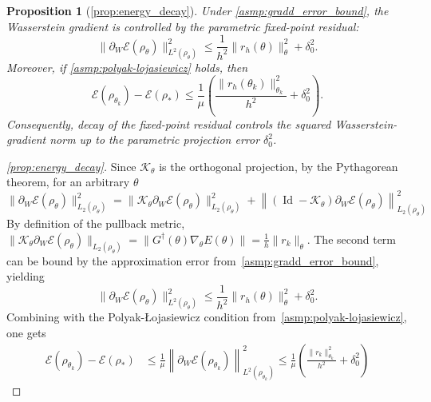 \documentclass{article} %
\newtheorem{proposition}{Proposition}[section]
\numberwithin{equation}{subsection}
\numberwithin{theorem}{section}
\newcommand{\cE}{\mathcal{E}}
\newcommand{\cK}{\mathcal{K}}
\newcommand{\Id}{\operatorname{Id}}
\begin{document}
\begin{proposition}[\autoref{prop:energy_decay}]
Under \autoref{asmp:gradd_error_bound}, the Wasserstein gradient is controlled
by the parametric fixed-point residual:
\begin{equation}\label{eq:projected_gradient_bound}
    \|\partial_W\cE(\rho_\theta)\|_{L^2(\rho_\theta)}^2
    \leq
    \frac{1}{h^2}\|r_h(\theta)\|_\theta^2
    +
    \delta_0^2 .
\end{equation}
Moreover, if \autoref{asmp:polyak-lojasiewicz} holds, then
\begin{equation}
    \cE(\rho_{\theta_k})-\cE(\rho_*)
    \leq
    \frac{1}{\mu}
    \left(
        \frac{\|r_h(\theta_k)\|_{\theta_k}^2}{h^2}
        +
        \delta_0^2
    \right).
\end{equation}
Consequently, decay of the fixed-point residual controls the squared
Wasserstein-gradient norm up to the parametric projection error $\delta_0^2$.
\end{proposition}

\begin{proof}[\autoref{prop:energy_decay}] Since $\cK_\theta$ is the orthogonal projection, by the Pythagorean theorem, for an arbitrary $\theta$ \[ \| \partial_W \cE(\rho_{\theta})\|_{L_2(\rho_{\theta})}^2 = \| \cK_\theta \partial_W \cE(\rho_{\theta})\|_{L_2(\rho_{\theta})}^2 + \left\| (\Id - \cK_\theta) \partial_W \cE(\rho_{\theta}) \right\|_{L_2(\rho_{\theta})}^2 \] By definition of the pullback metric, $\| \cK_\theta \partial_W \cE(\rho_{\theta})\|_{L_2(\rho_{\theta})} = \|G^{\dagger}(\theta)\nabla_{\theta}E(\theta)\| =\frac{1}{h}\| r_k\|_\theta$. The second term can be bound by the approximation error from~\autoref{asmp:gradd_error_bound}, yielding \[ \|\partial_W\cE(\rho_\theta)\|_{L^2(\rho_\theta)}^2 \leq \frac{1}{h^2}\|r_h(\theta)\|_\theta^2 + \delta_0^2. \] Combining with the Polyak-{\L}ojasiewicz condition from~\autoref{asmp:polyak-lojasiewicz}, one gets \begin{align*} \cE(\rho_{\theta_k}) - \cE(\rho_*) &\leq \frac{1}{\mu} \left\| \partial_W \cE(\rho_{\theta_k}) \right\|^2_{L^2(\rho_{\theta_k})} \leq \frac{1}{\mu} \left( \frac{\|r_k\|^2_{\theta_k}}{h^2} + \delta_0^2 \right) \end{align*} \end{proof}
\end{document}
